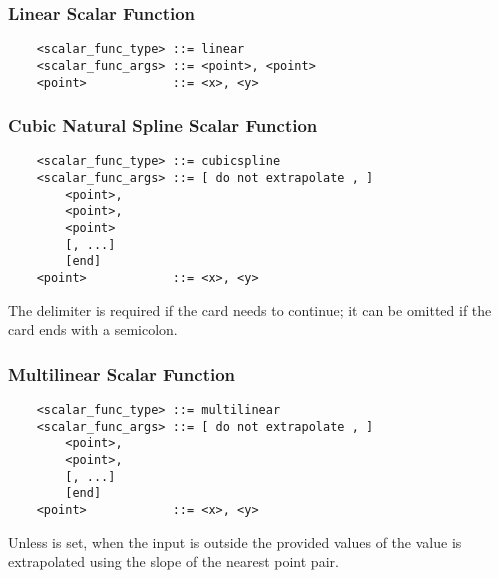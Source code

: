 \subsubsection{Linear Scalar Function}
\begin{verbatim}
    <scalar_func_type> ::= linear
    <scalar_func_args> ::= <point>, <point>
    <point>            ::= <x>, <y>
\end{verbatim}

\subsubsection{Cubic Natural Spline Scalar Function}
\begin{verbatim}
    <scalar_func_type> ::= cubicspline
    <scalar_func_args> ::= [ do not extrapolate , ]
        <point>, 
        <point>, 
        <point>
        [, ...]
        [end]
    <point>            ::= <x>, <y>
\end{verbatim}
The  delimiter is required if the card needs to continue;
it can be omitted if the card ends with a semicolon.

\subsubsection{Multilinear Scalar Function}
\begin{verbatim}
    <scalar_func_type> ::= multilinear
    <scalar_func_args> ::= [ do not extrapolate , ]
        <point>, 
        <point>, 
        [, ...]
        [end]
    <point>            ::= <x>, <y>
\end{verbatim}
Unless  is set, when the input is outside
the provided values of  the value is extrapolated using the slope
of the nearest point pair.

